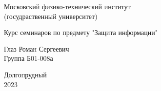 


\begin{titlepage}

    \newpage
    \begin{center}
        \normalsize Московский физико-технический институт \\
                         (госудраственный университет)
    \end{center}

    \vspace{6em}

    \begin{center}
        \Large Курс семинаров по предмету "Защита информации"\\
        \articleTopic
    \end{center}

    \vspace{1em}

    \begin{center}
        \Large \textbf{\articleName}
    \end{center}

    \vspace{2em}

    \begin{center}
        \large Глаз Роман Сергеевич\\
               Группа Б01-008а
    \end{center}

    \vspace{\fill}

    \begin{center}
        Долгопрудный \\
            2023
    \end{center}

\end{titlepage}


    \pagestyle{fancy}
    \fancyhead{}
    \fancyhead[L]{}
    \fancyfoot[C]{\thepage}
